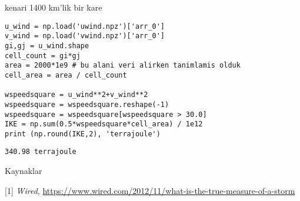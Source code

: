 \documentclass[12pt,fleqn]{article}\usepackage{../../common}
\begin{document}
kenari 1400 km'lik bir kare

\begin{verbatim}
u_wind = np.load('uwind.npz')['arr_0']
v_wind = np.load('vwind.npz')['arr_0']
gi,gj = u_wind.shape
cell_count = gi*gj
area = 2000*1e9 # bu alani veri alirken tanimlamis olduk
cell_area = area / cell_count

wspeedsquare = u_wind**2+v_wind**2
wspeedsquare = wspeedsquare.reshape(-1)
wspeedsquare = wspeedsquare[wspeedsquare > 30.0]
IKE = np.sum(0.5*wspeedsquare*cell_area) / 1e12
print (np.round(IKE,2), 'terrajoule')
\end{verbatim}

\begin{verbatim}
340.98 terrajoule
\end{verbatim}



Kaynaklar

[1] {\em Wired}, \url{https://www.wired.com/2012/11/what-is-the-true-measure-of-a-storm}
\end{document}
